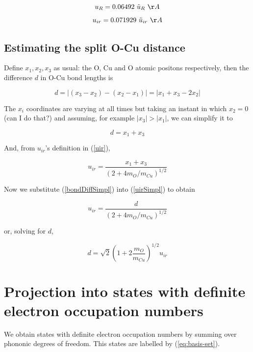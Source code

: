 \begin{equation}\label{uRvstildeuR} u_R = 0.06492\ \tilde{u}_R\ \AA\end{equation}
\begin{equation}\label{uirvstildeuir} u_{ir} = 0.071929\ \tilde{u}_{ir}\ \AA\end{equation}

\subsection{Estimating the split O-Cu distance}

Define $x_1,x_2,x_3$ as usual: the O, Cu and O atomic positons respectively, then the difference $d$ in O-Cu bond lengths is

\begin{equation}\label{bondDiff} d= \left| (x_3 - x_2) - (x_2 - x_1) \right| = \left| x_1 + x_3 - 2x_2 \right| \end{equation}

The $x_i$ coordinates are varying at all times but taking an instant in which $x_2=0$ (can I do that?) and assuming, for example $|x_3|>|x_1|$, we can simplify it to

\begin{equation}\label{bondDiffSimpl}d=x_1+x_3\end{equation}

And, from $u_{ir}$'s definition in (\ref{uir}),

\begin{equation}\label{uirSimpl} u_{ir}=\frac{x_1+x_3}{\left( 2+4 m_O/m_{Cu} \right)^{1/2}}\end{equation}

Now we substitute (\ref{bondDiffSimpl}) into (\ref{uirSimpl}) to obtain

\begin{equation}\label{uirvsd}u_{ir}=\frac{d}{\left( 2+4 m_O/m_{Cu} \right)^{1/2}} \end{equation}

or, solving for $d$,

\begin{equation}\label{dvsuir}d=\sqrt{2}\left(1 + 2\frac{m_O}{m_{Cu}} \right)^{1/2}u_{ir}\end{equation}

\section{Projection into states with definite electron occupation numbers}

We obtain states with definite electron occupation numbers by summing over phononic degrees of freedom. This states are labelled by (\ref{eq:basis-set}).

